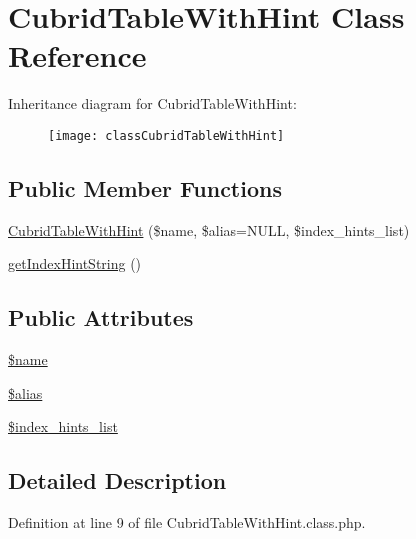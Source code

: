 \hypertarget{classCubridTableWithHint}{\section{Cubrid\+Table\+With\+Hint Class Reference}
\label{classCubridTableWithHint}
}
Inheritance diagram for Cubrid\+Table\+With\+Hint\+:\begin{figure}[H]
\begin{center}
\leavevmode
\texttt{[image: classCubridTableWithHint]}
\end{center}
\end{figure}
\subsection*{Public Member Functions}
\begin{DoxyCompactItemize}
\item 
\hyperlink{classCubridTableWithHint_a48c29472127ace98b9115e149abc664c}{Cubrid\+Table\+With\+Hint} (\$name, \$alias=N\+U\+L\+L, \$index\+\_\+hints\+\_\+list)
\item 
\hyperlink{classCubridTableWithHint_a581b44828759682ddda5ccbe7709d88b}{get\+Index\+Hint\+String} ()
\end{DoxyCompactItemize}
\subsection*{Public Attributes}
\begin{DoxyCompactItemize}
\item 
\hyperlink{classCubridTableWithHint_a29881ddda6971b68daf8719236f3b3f4}{\$name}
\item 
\hyperlink{classCubridTableWithHint_a6d3d82772e30eaaeb3f4f2cb5f137934}{\$alias}
\item 
\hyperlink{classCubridTableWithHint_abd22f208291f463ef34e7d5eeb127996}{\$index\+\_\+hints\+\_\+list}
\end{DoxyCompactItemize}


\subsection{Detailed Description}


Definition at line 9 of file Cubrid\+Table\+With\+Hint.\+class.\+php.



